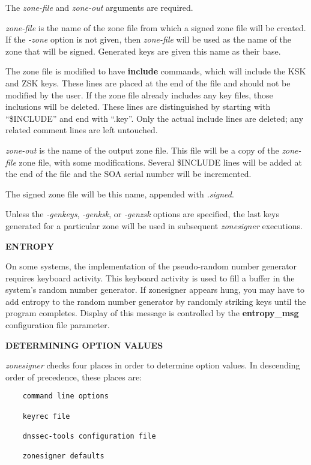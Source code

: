 The {\it zone-file} and {\it zone-out} arguments are required.

{\it zone-file} is the name of the zone file from which a signed zone file
will be created.  If the {\it -zone} option is not given, then {\it zone-file}
will be used as the name of the zone that will be signed.  Generated keys are
given this name as their base.

The zone file is modified to have {\bf include} commands, which will include
the KSK and ZSK keys.  These lines are placed at the end of the file and
should not be modified by the user.  If the zone file already includes any
key files, those inclusions will be deleted.  These lines are distinguished
by starting with ``\$INCLUDE'' and end with ``.key''.  Only the actual include
lines are deleted; any related comment lines are left untouched.

{\it zone-out} is the name of the output zone file.  This file will be a copy
of the {\it zone-file} zone file, with some modifications.  Several \$INCLUDE
lines will be added at the end of the file and the SOA serial number will be
incremented.

The signed zone file will be this name, appended with {\it .signed}.

Unless the {\it -genkeys}, {\it -genksk}, or {\it -genzsk} options are
specified, the last keys generated for a particular zone will be used in
subsequent {\it zonesigner} executions.

{\bf ENTROPY}

On some systems, the implementation of the pseudo-random number generator
requires keyboard activity.  This keyboard activity is used to fill a buffer
in the system's random number generator.  If zonesigner appears hung, you may
have to add entropy to the random number generator by randomly striking keys
until the program completes.  Display of this message is controlled by the
{\bf entropy\_msg} configuration file parameter.

{\bf DETERMINING OPTION VALUES}

{\it zonesigner} checks four places in order to determine option values.  
In descending order of precedence, these places are:

\begin{verbatim}
    command line options

    keyrec file

    dnssec-tools configuration file

    zonesigner defaults
\end{verbatim}

